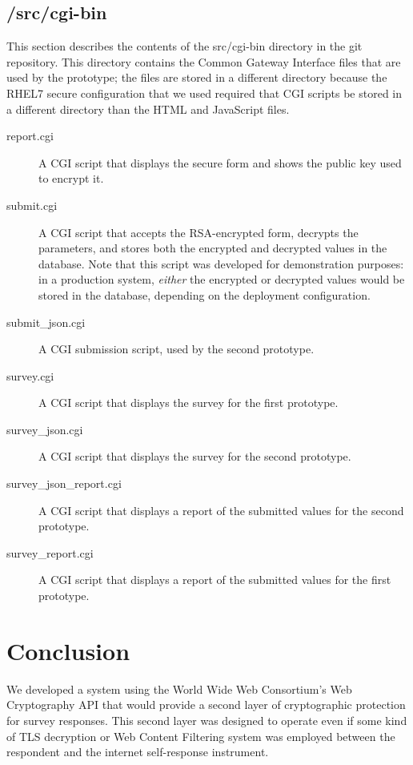 \documentclass[fleqn,10pt]{wlscirep}
\begin{document}
\subsection{/src/cgi-bin}
This section describes the contents of the src/cgi-bin directory in
the git repository. This directory contains the Common Gateway
Interface files that are used by the prototype; the files are stored
in a different directory because the RHEL7 secure configuration that
we used required that CGI scripts be stored in a different directory
than the HTML and JavaScript files.

\begin{description}

  \item[report.cgi] A CGI script that displays the secure form and
    shows the public key used to encrypt it.
    \item[submit.cgi] A CGI script that accepts the RSA-encrypted
      form, decrypts the parameters, and stores both the encrypted and
      decrypted values in the database. Note that this script was
      developed for demonstration purposes: in a production system,
      \emph{either} the encrypted or decrypted values would be stored
      in the database, depending on the deployment configuration.
      \item[submit\_json.cgi] A CGI submission script, used by the
        second prototype.
      \item[survey.cgi] A CGI script that displays the survey for the
        first prototype.
      \item[survey\_json.cgi] A CGI script that displays the survey
        for the second prototype.
      \item[survey\_json\_report.cgi] A CGI script that displays a
        report of the submitted values for the second prototype. 
      \item[survey\_report.cgi] A  CGI script that displays a
        report of the submitted values for the first prototype.
\end{description}        


\section{Conclusion}
We developed a system using the World Wide Web Consortium's Web
Cryptography API that would provide a second layer of cryptographic
protection for survey responses. This second layer was designed to
operate even if some kind of TLS decryption or Web Content Filtering
system was employed between the respondent and the internet
self-response instrument.
\end{document}
